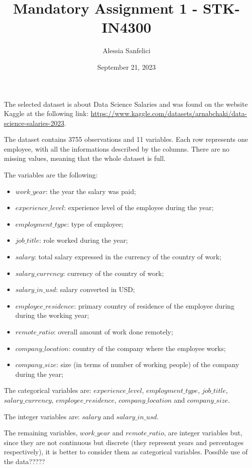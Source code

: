 \documentclass[
]{article}
\title{Mandatory Assignment 1 - STK-IN4300}
\author{Alessia Sanfelici}
\date{September 21, 2023}
\begin{document}
\maketitle

The selected dataset is about Data Science Salaries and was found on the
website Kaggle at the following link:
\url{https://www.kaggle.com/datasets/arnabchaki/data-science-salaries-2023}.

The dataset contains 3755 observations and 11 variables. Each row
represents one employee, with all the informations described by the
columns. There are no missing values, meaning that the whole dataset is
full.

The variables are the following:

\begin{itemize}
\item
  \(work\_year\): the year the salary was paid;
\item
  \(experience\_level\): experience level of the employee during the
  year;
\item
  \(employment\_type\): type of employee;
\item
  \(job\_title\): role worked during the year;
\item
  \(salary\): total salary expressed in the currency of the country of
  work;
\item
  \(salary\_currency\): currency of the country of work;
\item
  \(salary\_in\_usd\): salary converted in USD;
\item
  \(employee\_residence\): primary country of residence of the employee
  during during the working year;
\item
  \(remote\_ratio\): overall amount of work done remotely;
\item
  \(company\_location\): country of the company where the employee
  works;
\item
  \(company\_size\): size (in terms of number of working people) of the
  company during the year;
\end{itemize}

The categorical variables are: \(experience\_level\),
\(employment\_type\), \(job\_title\), \(salary\_currency\),
\(employee\_residence\), \(company\_location\) and \(company\_size\).

The integer variables are: \(salary\) and \(salary\_in\_usd\).

The remaining variables, \(work\_year\) and \(remote\_ratio\), are
integer variables but, since they are not continuous but discrete (they
represent years and percentages respectively), it is better to consider
them as categorical variables. \newline Possible use of the data?????
\end{document}
